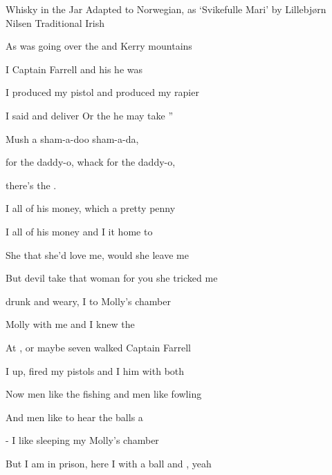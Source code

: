 \begin{SBSong}{Whisky in the Jar}
  {Adapted to Norwegian, as `Svikefulle Mari' by Lillebj\o rn Nilsen}
  {Traditional Irish}
  \begin{SBVerse}
    As  was going over the  and Kerry mountains
    
    I  Captain Farrell and his  he was 
    
    I  produced my pistol and  produced my rapier
    
    I said  and deliver Or the  he may take ''
  \end{SBVerse}
  \WBPageBrk
  \begin{SBChorus}
    Mush a  sham-a-doo sham-a-da,
    
     for the daddy-o, whack for the daddy-o, 

	there's   the .
  \end{SBChorus}
  \begin{SBVerse}
    I  all of his money, which  a pretty penny
    
    I  all of his money and I  it home to 
    
    She  that she'd love me,  would she leave me
    
    But  devil take that woman for you  she tricked me 
  \end{SBVerse}
  \begin{SBVerse}
     drunk and weary, I  to Molly's chamber
    
     Molly with me and I  knew the 
    
    At , or maybe seven  walked Captain Farrell
    
    I  up, fired my pistols and I  him with both 
  \end{SBVerse}
  \begin{SBVerse}
    Now  men like the fishing and  men like fowling
    
    And  men like to hear the balls a 
    
     - I like sleeping  my Molly's chamber
    
    But  I am in prison, here I  with a ball and , yeah
  \end{SBVerse}
\end{SBSong}

